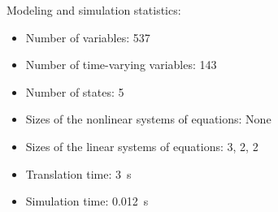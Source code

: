 \begin{contextbox}
  Modeling and simulation statistics:
  \begin{itemize}
    \item Number of variables: 537
    \item Number of time-varying variables: 143
    \item Number of states: 5
    \item Sizes of the nonlinear systems of equations: None
    \item Sizes of the linear systems of equations: 3, 2, 2
    \item Translation time: \SI{3}{s}
    \item Simulation time: \SI{0.012}{s}
  \end{itemize}
\end{contextbox}